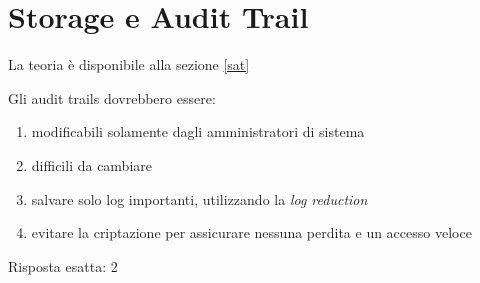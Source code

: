\section{Storage e Audit Trail}
\label{EsSat}

La teoria è disponibile alla sezione \ref{sat}


\begin{Exercise} [
  title={Domanda},
  label={sat1}
  ]
  
  \Question Gli audit trails dovrebbero essere:
  \begin{enumerate}
    \item modificabili solamente dagli amministratori di sistema
    \item difficili da cambiare
    \item salvare solo log importanti, utilizzando la \textit{log reduction}
    \item evitare la criptazione per assicurare nessuna perdita e un accesso 
    veloce
  \end{enumerate}
  
\end{Exercise}


\begin{Answer} [
  ref={sat1},
  number={1}
  ]
  
  \Question Risposta esatta: 2
  
\end{Answer}